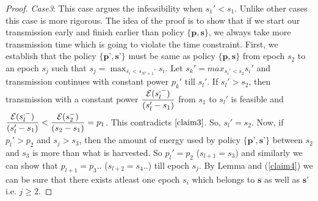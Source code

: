 \begin{proof}
\textit{Case3}: This case argues the infeasibility when $s_1'<s_1$. Unlike other cases this case is more rigorous. The idea of the proof is to show that if we start our transmission early and finish earlier than policy $\{\textbf{p},\textbf{s}\}$, we always take more transmission time which is going to violate the time constraint. First, we establish that the policy $\{\textbf{p'},\textbf{s'}\}$ must be same as policy $\{\textbf{p},\textbf{s}\}$ from epoch $s_2$ to an epoch $s_j$ such that $s_j=\max_{s_i<s_{N'+1}'} s_i$. Let $s_k'=max_{s_i'<s_2}s_i'$ and transmission continues with constant power $p_k'$ till $s_l'$. If $s_l'>s_2$, then transmission with a constant power $\dfrac{\mathcal{E}(s_l^{,-})}{(s_l'-s_1)} $ from $s_1$ to $s_l'$ is feasible and $\dfrac{\mathcal{E}(s_l^{,-})}{(s_l'-s_1)}<\dfrac{\mathcal{E}(s_2^-)}{(s_2-s_1)}=p_1$. This contradicts $\ref{claim3}$. So, $s_l'=s_2$. Now, if $p_l'>p_2$ and $s_j>s_3$, then the amount of energy used by policy $\{\textbf{p'},\textbf{s'}\}$ between $s_2$ and $s_3$ is more than what is harvested. So $p_l'=p_2$ ($s_{l+1}=s_3$) and similarly we can show that $p_{l+1}=p_3$.. ($ s_{l+2}=s_4$..) till epoch $s_j$. By Lemma and (\ref{claim4}) we can be sure that there exists atleast one epoch $s_i$ which belongs to $\textbf{s}$ as well as $\textbf{s'}$ i.e. $j\ge 2$.


\end{proof}
